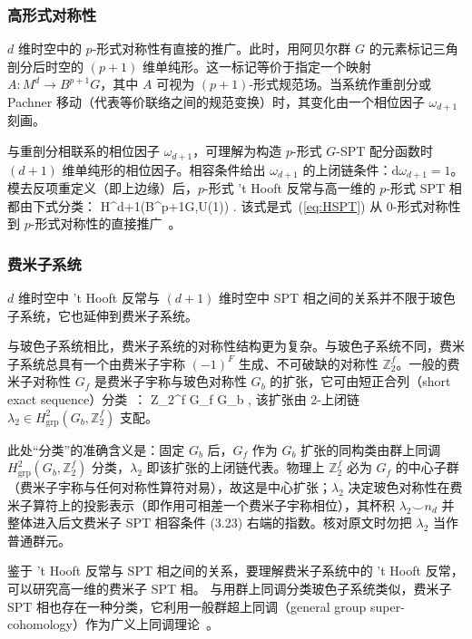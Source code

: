 \subsubsection{高形式对称性}

$d$ 维时空中的 $p$-形式对称性有直接的推广。此时，用阿贝尔群 $G$ 的元素标记三角剖分后时空的 $(p+1)$ 维单纯形。这一标记等价于指定一个映射 $A: M^d \rightarrow B^{p+1}G$，其中 $A$ 可视为 $(p+1)$-形式规范场。当系统作重剖分或 Pachner 移动（代表等价联络之间的规范变换）时，其变化由一个相位因子 $\omega_{d+1}$ 刻画。

与重剖分相联系的相位因子 $\omega_{d+1}$，可理解为构造 $p$-形式 $G$-SPT 配分函数时 $(d+1)$ 维单纯形的相位因子。相容条件给出 $\omega_{d+1}$ 的上闭链条件：$\mathrm{d} \omega_{d+1} = 1$。模去反项重定义（即上边缘）后，$p$-形式 't Hooft 反常与高一维的 $p$-形式 SPT 相都由下式分类：
\be
H^{d+1}(B^{p+1}G,U(1)) \cong [B^{p+1}G,B^{d+1} U(1)].
\ee
该式是式~(\ref{eq:HSPT}) 从 0-形式对称性到 $p$-形式对称性的直接推广~\cite{thorngren2015higher,kapustin2017higher}。

\subsubsection{费米子系统}

$d$ 维时空中 't Hooft 反常与 $(d+1)$ 维时空中 SPT 相之间的关系并不限于玻色子系统，它也延伸到费米子系统。

与玻色子系统相比，费米子系统的对称性结构更为复杂。与玻色子系统不同，费米子系统总具有一个由费米子宇称 $(-1)^F$ 生成、不可破缺的对称性 $\mathbb{Z}_2^f$。一般的费米子对称性 $G_f$ 是费米子宇称与玻色对称性 $G_b$ 的扩张，它可由短正合列（short exact sequence）分类~\cite{wang2020construction}：
\rightarrow \mathbb Z_2^f \rightarrow G_f \rightarrow G_b ,
\ee
该扩张由 2-上闭链 $\lambda_2\in H^2_\mathrm{grp}(G_b,\mathbb Z_2^f)$ 支配。

\begin{yizhu}此处“分类”的准确含义是：固定 $G_b$ 后，$G_f$ 作为 $G_b$ 扩张的同构类由群上同调 $H^2_{\mathrm{grp}}(G_b,\mathbb{Z}_2^f)$ 分类，$\lambda_2$ 即该扩张的上闭链代表。物理上 $\mathbb{Z}_2^f$ 必为 $G_f$ 的中心子群（费米子宇称与任何对称性算符对易），故这是中心扩张；$\lambda_2$ 决定玻色对称性在费米子算符上的投影表示（即作用可相差一个费米子宇称相位），其杯积 $\lambda_2\smile n_d$ 并整体进入后文费米子 SPT 相容条件 (3.23) 右端的指数。核对原文时勿把 $\lambda_2$ 当作普通群元。\end{yizhu}

鉴于 't Hooft 反常与 SPT 相之间的关系，要理解费米子系统中的 't Hooft 反常，可以研究高一维的费米子 SPT 相。
与用群上同调分类玻色子系统类似，费米子 SPT 相也存在一种分类，它利用一般群超上同调（general group super-cohomology）作为广义上同调理论~\cite{gu2014symmetry,wang2018towards,Xiong_2018,gaiotto2019symmetry,wang2020construction}。

